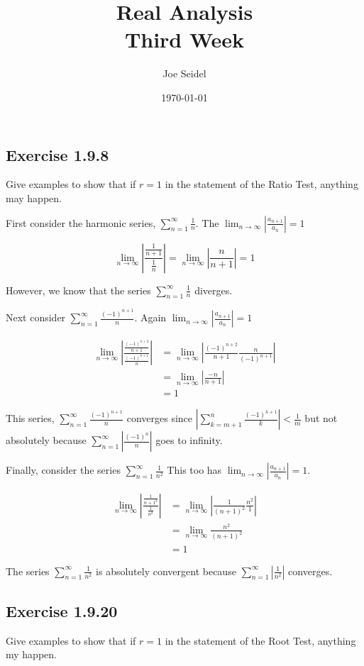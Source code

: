 \documentclass{tufte-book}
\title{Real Analysis\\Third Week }
\author{Joe Seidel}
\date{\today}
\theoremstyle{mytheoremstyle}
\theoremstyle{mylemstyle}
\theoremstyle{mydefstyle}
\begin{document}
\maketitle
{}
\newpage
{}


\subsection{Exercise 1.9.8}
Give examples to show that if $r=1$ in the statement of the Ratio Test, anything may happen.


First consider the harmonic series, $\sum_{n=1}^{\infty}\frac{1}{n}$. The $\lim_{n \to \infty}|\frac{a_{n+1}}{a_n}| = 1$

\[ \lim_{n \to \infty}|\frac{\frac{1}{n+1}}{\frac{1}{n}}| = \lim_{n \to \infty}|\frac{n}{n+1}| = 1 \]

However, we know that the series $\sum_{n=1}^{\infty}\frac{1}{n}$ diverges.

Next consider $\sum_{n=1}^{\infty}\frac{(-1)^{n+1}}{n}$.  Again $\lim_{n \to \infty}|\frac{a_{n+1}}{a_n}| = 1$

\begin{align*}
\lim_{n \to \infty}|\frac{\frac{(-1)^{n+2}}{n+1}}{\frac{(-1)^{n+1}}{n}}| &= \lim_{n \to \infty}|\frac{(-1)^{n+2}}{n+1} \frac{n}{(-1)^{n+1}}| \\
&= \lim_{n \to \infty}|\frac{-n}{n+1}|\\
&= 1
\end{align*}

This series, $\sum_{n=1}^{\infty}\frac{(-1)^{n+1}}{n}$ converges since $|\sum_{k=m+1}^{n}\frac{(-1)^{k+1}}{k}| < \frac{1}{m}$ but not absolutely because $\sum_{n=1}^{\infty}|\frac{(-1)^n}{n}|$ goes to infinity.

Finally, consider the series $\sum_{n=1}^{\infty} \frac{1}{n^2}$  This too has $\lim_{n \to \infty} |\frac{a_{n+1}}{a_n}| = 1$.

\begin{align*}
\lim_{n \to \infty} |\frac{\frac{1}{n+1^2}}{\frac{1}{n^2}}| &= \lim_{n \to \infty} |\frac{1}{(n+1)^2} \frac{n^2}{1}| \\
&= \lim_{n \to \infty}\frac{n^2}{(n+1)^2} \\
&= 1
\end{align*}

The series $\sum_{n=1}^{\infty} \frac{1}{n^2}$ is absolutely convergent because $\sum_{n=1}^{\infty}|\frac{1}{n^2}|$ converges. 

\subsection{Exercise 1.9.20}
Give examples to show that if $r = 1$ in the statement of the Root Test, anything my happen.
\end{document}
